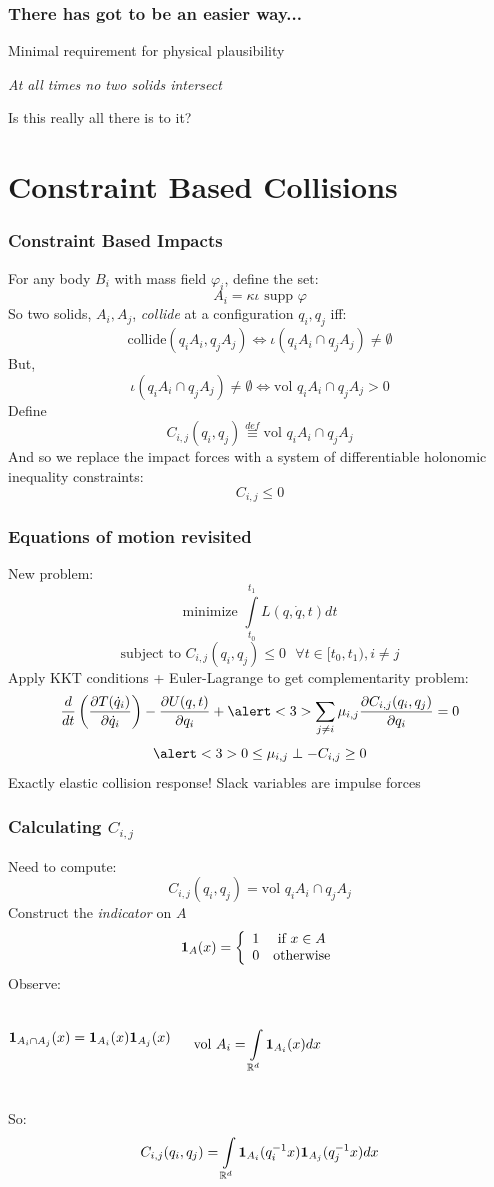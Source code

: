 \documentclass{beamer}
\begin{document}
\begin{frame}
\frametitle{There has got to be an easier way...}
\pause
Minimal requirement for physical plausibility
\vskip7pt
\begin{center}
\emph{At all times no two solids intersect}
\end{center}
\pause
\vskip15pt
Is this really all there is to it?

\end{frame}

\section{Constraint Based Collisions}
\begin{frame}
\frametitle{Constraint Based Impacts}
For any body $B_i$ with mass field $\varphi_i$, define the set:
\[ A_i = \kappa \iota \text{ supp } \varphi \]
\pause
So two solids, $A_i, A_j$, \emph{collide} at a configuration $q_i, q_j$ iff:
\[ \text{collide}(q_i A_i, q_j A_j) \Leftrightarrow \iota (q_i A_i \cap q_j A_j) \neq \emptyset \]
\pause
But,
\[ \iota ( q_i A_i \cap q_j A_j ) \neq \emptyset \Leftrightarrow \text{vol } q_i A_i \cap q_j A_j > 0 \]
\pause
Define
\[ C_{i,j}(q_i, q_j) \stackrel{def}{\equiv} \text{vol } q_i A_i \cap q_j A_j \]
And so we replace the impact forces with a system of differentiable holonomic inequality constraints:
\[ C_{i,j} \leq 0 \]
\end{frame}

\begin{frame}
\frametitle{Equations of motion revisited}
New problem:
\[ \text{minimize } \int \limits_{t_0}^{t_1} L(q, \dot{q}, t) dt \]
\[ \text{subject to } C_{i,j}(q_i, q_j) \leq 0 \:\:\: \forall t \in [t_0, t_1), i \neq j \]
\pause
Apply KKT conditions + Euler-Lagrange to get complementarity problem:
\[ \frac{d}{dt} \left( \frac{\partial T(\dot{q}_i)}{\partial \dot{q}_i} \right)
- \frac{\partial U(q, t)}{\partial q_i} + \alert<3>{\sum \limits_{j \neq i} \mu_{i,j} \frac{ \partial C_{i,j}(q_i, q_j)}{ \partial{q_i} }} = 0 \]
\[ \alert<3>{0 \leq \mu_{i,j} \perp -C_{i,j} \geq 0} \]
\pause
Exactly elastic collision response!
\vskip5pt
Slack variables are impulse forces
\end{frame}

\begin{frame}
\frametitle{Calculating $C_{i,j}$}
Need to compute:
\[ C_{i,j}(q_i, q_j) = \text{vol } q_i A_i \cap q_j A_j \]
\pause
Construct the \emph{indicator} on $A$
\[ {\bf 1}_{A}(x) = \left \{ \begin{array}{cc}
1 & \text{if } x \in A \\
0 & \text{otherwise}
\end{array} \right. \]
\pause
Observe:
\begin{columns}
		{\centering
		\[ {\bf 1}_{A_i \cap A_j}(x) = {\bf 1}_{A_i}(x) {\bf 1}_{A_j}(x)  \]
		}
	
		{\centering
		\[ \text{vol } A_i = \int \limits_{\mathbb{R}^d} {\bf 1}_{A_i}(x) dx \]
		}
\end{columns}
\pause
So:
\[ C_{i,j}(q_i, q_j) = \int \limits_{\mathbb{R}^d} {\bf 1}_{A_i}(q_i^{-1} x) {\bf 1}_{A_j}(q_j^{-1} x) dx \]
\end{frame}
\end{document}
